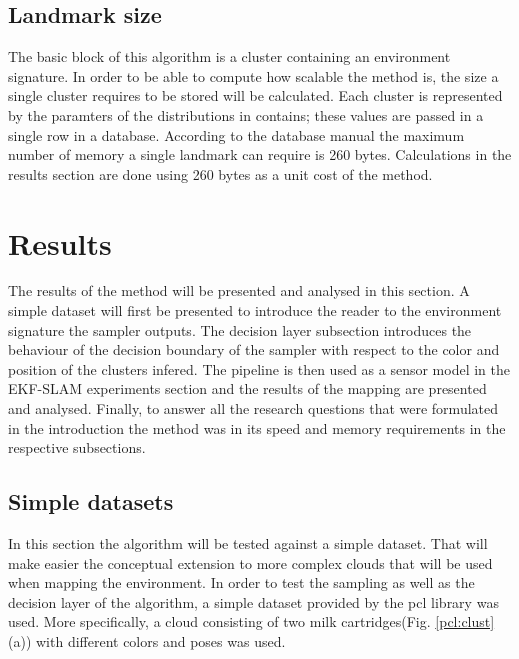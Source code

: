 \documentclass[twoside,hidelinks]{article}
\begin{document}
\subsection{Landmark size}


The basic block of this algorithm is a cluster containing an environment signature. In order to be able to compute how scalable the method is, the size a single cluster requires to be stored will be calculated. Each cluster is represented by the paramters of the distributions in contains; these values are passed in a single row in a database\cite{sqlite}. According to the database manual the maximum number of memory a single landmark can require is 260 bytes. Calculations in the results section are done using 260 bytes as a unit cost of the method. 

\newpage
\section{Results}
\label{sec:results}

The results of the method will be presented and analysed in this section. A simple dataset will first be presented to introduce the reader to the environment signature the sampler outputs. The decision layer subsection introduces the behaviour of the decision boundary of the sampler with respect to the color and position of the clusters infered. The pipeline is then used as a sensor model in the EKF-SLAM experiments section and the results of the mapping are presented and analysed. Finally, to answer all the research questions that were formulated in the introduction the method was in its speed and memory requirements in the respective subsections.


\subsection{Simple datasets}

In this section the algorithm will be tested against a simple dataset. That will make easier the conceptual extension to more complex clouds that will be used when mapping the environment. In order to test the sampling as well as the decision layer of the algorithm, a simple dataset provided by the pcl\cite{pcl} library was used. More specifically, a cloud consisting of two milk cartridges(Fig. \ref{pcl:clust}(a)) with different colors and poses was used. 
\end{document}

